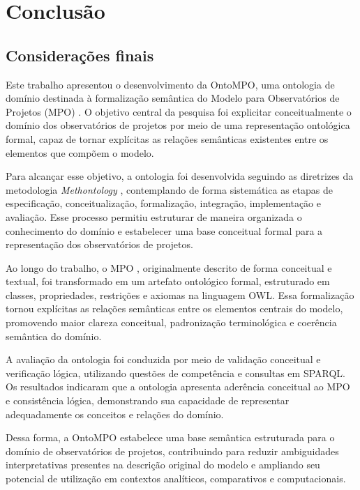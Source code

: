 \chapter{Conclusão}

\section{Considerações finais}

Este trabalho apresentou o desenvolvimento da OntoMPO, uma ontologia de domínio destinada à formalização semântica do Modelo para Observatórios de Projetos (MPO) \cite{vieira2022thesis}. O objetivo central da pesquisa foi explicitar conceitualmente o domínio dos observatórios de projetos por meio de uma representação ontológica formal, capaz de tornar explícitas as relações semânticas existentes entre os elementos que compõem o modelo.

Para alcançar esse objetivo, a ontologia foi desenvolvida seguindo as diretrizes da metodologia \textit{Methontology} \cite{fernandez1997methontology}, contemplando de forma sistemática as etapas de especificação, conceitualização, formalização, integração, implementação e avaliação. Esse processo permitiu estruturar de maneira organizada o conhecimento do domínio e estabelecer uma base conceitual formal para a representação dos observatórios de projetos.

Ao longo do trabalho, o MPO \cite{vieira2022thesis}, originalmente descrito de forma conceitual e textual, foi transformado em um artefato ontológico formal, estruturado em classes, propriedades, restrições e axiomas na linguagem OWL. Essa formalização tornou explícitas as relações semânticas entre os elementos centrais do modelo, promovendo maior clareza conceitual, padronização terminológica e coerência semântica do domínio.

A avaliação da ontologia foi conduzida por meio de validação conceitual e verificação lógica, utilizando questões de competência e consultas em SPARQL. Os resultados indicaram que a ontologia apresenta aderência conceitual ao MPO e consistência lógica, demonstrando sua capacidade de representar adequadamente os conceitos e relações do domínio.

Dessa forma, a OntoMPO estabelece uma base semântica estruturada para o domínio de observatórios de projetos, contribuindo para reduzir ambiguidades interpretativas presentes na descrição original do modelo e ampliando seu potencial de utilização em contextos analíticos, comparativos e computacionais.

